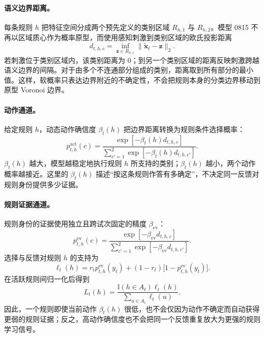 \paragraph{语义边界距离。}
每条规则 $h$ 把特征空间分成两个预先定义的类别区域 $R_{h,1}$ 与
$R_{h,2}$。模型 0815 不再以区域质心作为概率原型，而使用感知刺激到类别区域的欧氏投影距离
\begin{equation}
d_{t,h,c}
=\inf_{\mathbf z\in R_{h,c}}
\lVert\widetilde{\mathbf x}_t-\mathbf z\rVert_2.
\label{eq:m0815-boundary-distance}
\end{equation}
若刺激位于类别区域内，该类别距离为 0；到另一个类别区域的距离反映刺激跨越语义边界的间隔。对于由多个不连通部分组成的类别，距离取到所有部分的最小值。这样，软概率只表达边界附近的不确定性，不会把规则本身的分类边界移动到原型 Voronoi 边界。

\paragraph{动作通道。}
给定规则 $h$，动态动作确信度 $\beta_t(h)$ 把边界距离转换为规则条件选择概率：
\begin{equation}
p^{\mathrm{act}}_{t,h}(c)
=
\frac{\exp[-\beta_t(h)d_{t,h,c}]}
{\sum_{c'=1}^{2}\exp[-\beta_t(h)d_{t,h,c'}]}.
\label{eq:m0815-action-emission}
\end{equation}
$\beta_t(h)$ 越大，模型越稳定地执行规则 $h$ 所支持的类别；$\beta_t(h)$ 越小，两个动作概率越接近。这里的 $\beta_t(h)$ 描述“按这条规则作答有多确定”，不决定同一反馈对规则身份提供多少证据。

\paragraph{规则证据通道。}
规则身份的证据使用独立且跨试次固定的精度 $\beta_{\mathrm{ev}}$：
\begin{equation}
p^{\mathrm{ev}}_{t,h}(c)
=
\frac{\exp[-\beta_{\mathrm{ev}}d_{t,h,c}]}
{\sum_{c'=1}^{2}\exp[-\beta_{\mathrm{ev}}d_{t,h,c'}]}.
\label{eq:m0815-evidence-emission}
\end{equation}
选择与反馈对规则 $h$ 的支持为
\begin{equation}
\ell_t(h)
=r_tp^{\mathrm{ev}}_{t,h}(y_t)
+(1-r_t)\bigl[1-p^{\mathrm{ev}}_{t,h}(y_t)\bigr].
\label{eq:m0815-feedback-support}
\end{equation}
在活跃规则间归一化后得到
\begin{equation}
L_t(h)=
\frac{\mathbb I(h\in A_t)\ell_t(h)}
{\sum_{u\in A_t}\ell_t(u)}.
\label{eq:m0815-normalized-evidence}
\end{equation}
因此，一个规则即使当前动作 $\beta_t(h)$ 很低，也不会仅因为动作不确定而自动获得更弱的规则证据；反之，高动作确信度也不会把同一个反馈重复放大为更强的规则学习信号。


